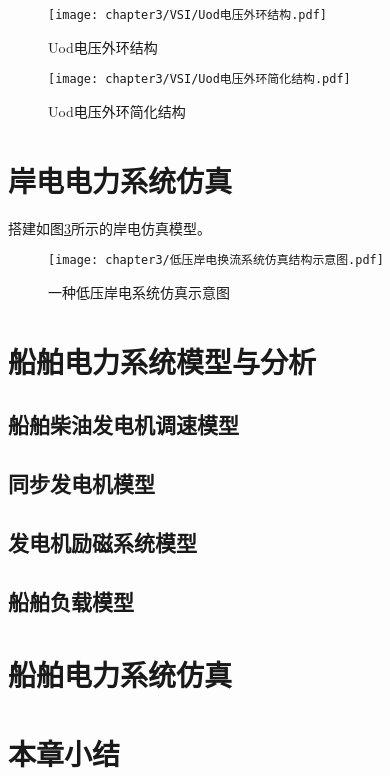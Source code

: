 \begin{figure}[!htp]
	\centering
	\texttt{[image: chapter3/VSI/Uod电压外环结构.pdf]}
	\caption{Uod电压外环结构}
	\label{fig:Uod电压外环结构}
\end{figure}

\begin{figure}[!htp]
	\centering
	\texttt{[image: chapter3/VSI/Uod电压外环简化结构.pdf]}
	\caption{Uod电压外环简化结构}
	\label{fig:Uod电压外环简化结构}
\end{figure}

\section{岸电电力系统仿真}

搭建如图\ref{fig:低压岸电系统仿真示意图}所示的岸电仿真模型。

\begin{figure}[!htp]
	\centering
	\texttt{[image: chapter3/低压岸电换流系统仿真结构示意图.pdf]}
	\caption{一种低压岸电系统仿真示意图}
	\label{fig:低压岸电系统仿真示意图}
\end{figure}

\section{船舶电力系统模型与分析}

\subsection{船舶柴油发电机调速模型}

\subsection{同步发电机模型}

\subsection{发电机励磁系统模型}

\subsection{船舶负载模型}

\section{船舶电力系统仿真}


\section{本章小结}